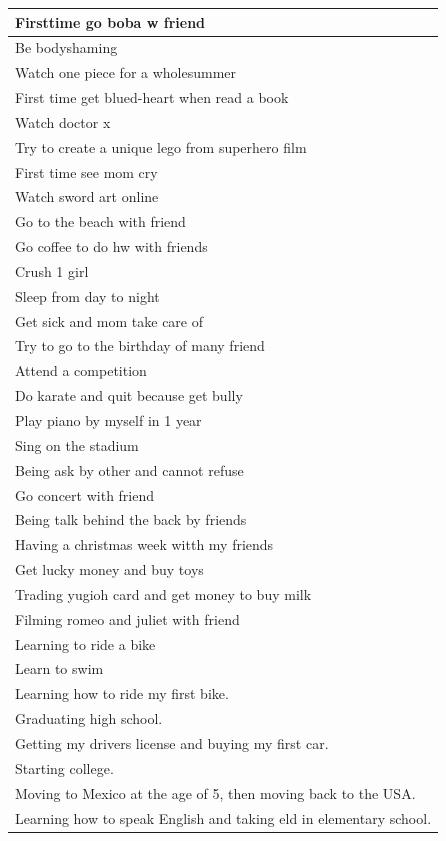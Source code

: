\documentclass[
  .7em,
  letterpaper,
  DIV=11,
  numbers=noendperiod]{scrartcl}
\begin{document}
\begin{table}
\begin{tabular}{l}
Firsttime go boba w friend\\
\hline
Be bodyshaming\\
\hline
Watch one piece for a wholesummer\\
\hline
First time get blued-heart when read a book\\
\hline
Watch doctor x\\
\hline
Try to create a unique lego from superhero film\\
\hline
First time see mom cry\\
\hline
Watch sword art online\\
\hline
Go to the beach with friend\\
\hline
Go coffee to do hw with friends\\
\hline
Crush 1 girl\\
\hline
Sleep from day to night\\
\hline
Get sick and mom take care of\\
\hline
Try to go to the birthday of many friend\\
\hline
Attend a competition\\
\hline
Do karate and quit because get bully\\
\hline
Play piano by myself in 1 year\\
\hline
Sing on the stadium\\
\hline
Being ask by other and cannot refuse\\
\hline
Go concert with friend\\
\hline
Being talk behind the back by friends\\
\hline
Having a christmas week witth my friends\\
\hline
Get lucky money and buy toys\\
\hline
Trading yugioh card and get money to buy milk\\
\hline
Filming romeo and juliet with friend\\
\hline
Learning to ride a bike\\
\hline
Learn to swim\\
\hline
Learning how to ride my first bike.\\
\hline
Graduating high school.\\
\hline
Getting my drivers license and buying my first car.\\
\hline
Starting college.\\
\hline
Moving to Mexico at the age of 5, then moving back to the USA.\\
\hline
Learning how to speak English and taking eld in elementary school.\\

\end{tabular}
\end{table}
\end{document}
